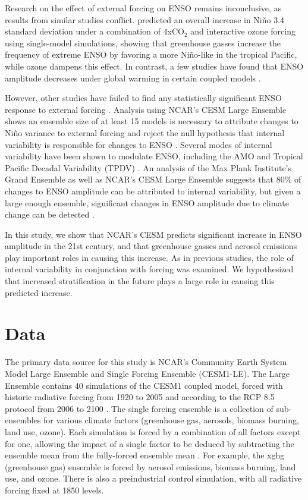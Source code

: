 \documentclass[draft]{agujournal2019}
\begin{document}
  Research on the effect of external forcing on ENSO remains inconclusive, as results from similar studies conflict.  predicted an overall increase in Ni\~{n}o 3.4 standard deviation under a combination of 4xCO$_2$ and interactive ozone forcing using single-model simulations, showing that greenhouse gasses increase the frequency of extreme ENSO by favoring a more Ni\~{n}o-like in the tropical Pacific, while ozone dampens this effect. In contrast, a few studies have found that ENSO amplitude decreases under global warming in certain coupled models \cite{kohyama2018weakening}.

However, other studies have failed to find any statistically significant ENSO response to external forcing \cite{stevenson2012significant}. Analysis using NCAR's CESM Large Ensemble shows an ensemble size of at least 15 models is necessary to attribute changes to Ni\~{n}o variance to external forcing and reject the null hypothesis that internal variability is responsible for changes to ENSO \cite{zheng2018response}. Several modes of internal variability have been shown to modulate ENSO, including the AMO \cite{levine2017impact} and Tropical Pacific Decadal Variability (TPDV) \cite{zheng2018response}. An analysis of the Max Plank Institute's Grand Ensemble as well as NCAR's CESM Large Ensemble suggests that 80\% of changes to ENSO amplitude can be attributed to internal variability, but given a large enough ensemble, significant changes in ENSO amplitude due to climate change can be detected \cite{maher2018enso}.

In this study, we show that NCAR's CESM predicts significant increase in ENSO amplitude in the 21st century, and that greenhouse gasses and aerosol emissions play important roles in causing this increase. As in previous studies, the role of internal variability in conjunction with forcing was examined. We hypothesized that increased stratification in the future plays a large role in causing this predicted increase.

\section{Data}

The primary data source for this study is NCAR's Community Earth System Model Large Ensemble and Single Forcing Ensemble (CESM1-LE). The Large Ensemble contains 40 simulations of the CESM1 coupled model, forced with historic radiative forcing from 1920 to 2005 and according to the RCP 8.5 protocol from 2006 to 2100 \cite{kay2015community}. The single forcing ensemble is a collection of sub-ensembles for various climate factors (greenhouse gas, aerosols, biomass burning, land use, ozone). Each simulation is forced by a combination of all factors except for one, allowing the impact of a single factor to be deduced by subtracting the ensemble mean from the fully-forced ensemble mean \cite{deser2020isolating}. For example, the xghg (greenhouse gas) ensemble is forced by aerosol emissions, biomass burning, land use, and ozone. There is also a preindustrial control simulation, with all radiative forcing fixed at 1850 levels. 
\end{document}
